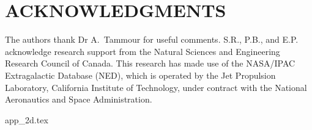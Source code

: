 \documentclass[useAMS,usenatbib]{mn2e}
\begin{document}
\section*{ACKNOWLEDGMENTS}
The authors thank Dr A.\ Tammour for useful comments. 
S.R., P.B., and E.P. acknowledge research support from the Natural Sciences and Engineering Research Council of Canada. This research has made use of the NASA/IPAC Extragalactic Database (NED), which is operated by the Jet Propulsion Laboratory, California Institute of Technology, under contract with the National Aeronautics and Space Administration.


{app_2d.tex}
\end{document}
